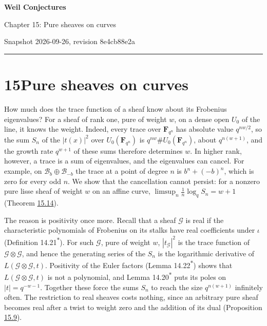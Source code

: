 \documentclass[11pt]{article}
\newcommand{\bpout}[1]{#1\textsuperscript{\hyperlink{bp-outside}{\ensuremath{\ast}}}}
\begin{document}
\pagestyle{plain}
\begin{center}
{\LARGE\bfseries Weil Conjectures\par}
\vspace{0.7em}
{\large Chapter 15: Pure sheaves on curves\par}
\vspace{0.5em}
{\small\color{bpmuted}Snapshot 2026-09-26, revision 8e4cb88e2a\par}
\end{center}
\vspace{0.5em}
{\small\tableofcontents}
\bigskip\hrule\bigskip

\section*{\texorpdfstring{15\quad Pure sheaves on curves}{15 Pure sheaves on curves}}
\label{bp1}%
\label{bp2}%
How much does the trace function of a sheaf know about its Frobenius eigenvalues? For a sheaf of rank one, pure of weight \(w\), on a dense open \(U_0\) of the line, it knows the weight. Indeed, every trace over \(\mathbf F_{q^n}\) has absolute value \(q^{nw/2}\), so the sum \(S_n\) of the \(|t(x)|^2\) over \(U_0(\mathbf F_{q^n})\) is \(q^{nw}\#U_0(\mathbf F_{q^n})\), about \(q^{n(w+1)}\), and the growth rate \(q^{w+1}\) of these sums therefore determines \(w\). In higher rank, however, a trace is a sum of eigenvalues, and the eigenvalues can cancel. For example, on \(\mathcal B_b\oplus\mathcal B_{-b}\) the trace at a point of degree \(n\) is \(b^n+(-b)^n\), which is zero for every odd \(n\). We show that the cancellation cannot persist: for a nonzero pure lisse sheaf of weight \(w\) on an affine curve, \(\limsup_n\frac1n\log_qS_n=w+1\) (Theorem \hyperref[bp41]{15.14}).

The reason is positivity once more. Recall that a sheaf \(\mathcal G\) is real if the characteristic polynomials of Frobenius on its stalks have real coefficients under \(\iota\) (Definition \bpout{14.21}). For such \(\mathcal G\), pure of weight \(w\), \(|t_{\mathcal G}|^2\) is the trace function of \(\mathcal G\otimes\mathcal G\), and hence the generating series of the \(S_n\) is the logarithmic derivative of \(L(\mathcal G\otimes\mathcal G,t)\). Positivity of the Euler factors (Lemma \bpout{14.22}) shows that \(L(\mathcal G\otimes\mathcal G,t)\) is not a polynomial, and Lemma \bpout{14.20} puts its poles on \(|t|=q^{-w-1}\). Together these force the sums \(S_n\) to reach the size \(q^{n(w+1)}\) infinitely often. The restriction to real sheaves costs nothing, since an arbitrary pure sheaf becomes real after a twist to weight zero and the addition of its dual (Proposition \hyperref[bp27]{15.9}).
\end{document}
